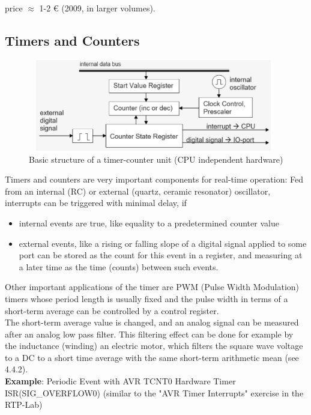 price $\mathrm{\approx}$ 1-2 € (2009, in larger volumes).
\newpage

\subsection {Timers and Counters}

    \begin{figure}[h]
    \centering
    \includegraphics[width=11cm, height=4cm]{Images/image162.png}
    \caption{Basic structure of a timer-counter unit (CPU independent hardware)}
    \label{fig:Fig }
    \end{figure}

Timers and counters are very important components for real-time operation: Fed from an internal (RC) or external (quartz, ceramic resonator) oscillator, interrupts can be triggered with minimal delay, if

\begin{itemize}
\item  internal events are true, like equality to a predetermined counter value
\item  external events, like a rising or falling slope of a digital signal applied to some port can be stored as the count for this event in a register, and measuring at a later time as the time (counts) between such events.
\end{itemize}

Other important applications of the timer are PWM (Pulse Width Modulation) timers whose period length is usually fixed and the pulse width in terms of a short-term average can be controlled by a control register.\\

The short-term average value is changed, and an analog signal can be measured after an analog low pass filter. This filtering effect can be done for example by the inductance (winding) an electric motor, which filters the square wave voltage to a DC to a short time average with the same short-term arithmetic mean (see 4.4.2).\\


\textbf{Example}: Periodic Event with AVR TCNT0 Hardware Timer  ISR(SIG\_OVERFLOW0) (similar to the "AVR Timer Interrupts" exercise in the RTP-Lab)

